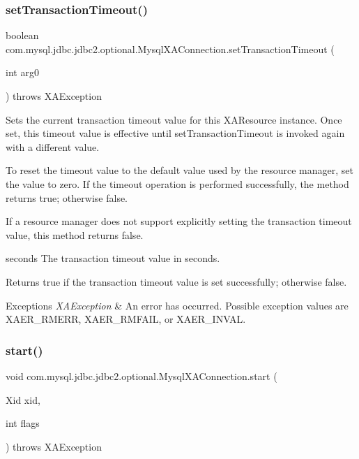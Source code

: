 \subsubsection{\texorpdfstring{set\+Transaction\+Timeout()}{setTransactionTimeout()}}
{\footnotesize\ttfamily boolean com.\+mysql.\+jdbc.\+jdbc2.\+optional.\+Mysql\+X\+A\+Connection.\+set\+Transaction\+Timeout (\begin{DoxyParamCaption}\item[{int}]{arg0 }\end{DoxyParamCaption}) throws X\+A\+Exception}

Sets the current transaction timeout value for this X\+A\+Resource instance. Once set, this timeout value is effective until set\+Transaction\+Timeout is invoked again with a different value.

To reset the timeout value to the default value used by the resource manager, set the value to zero. If the timeout operation is performed successfully, the method returns true; otherwise false.

If a resource manager does not support explicitly setting the transaction timeout value, this method returns false.

seconds The transaction timeout value in seconds.

\begin{DoxyReturn}{Returns}
true if the transaction timeout value is set successfully; otherwise false.
\end{DoxyReturn}

\begin{DoxyExceptions}{Exceptions}
{\em X\+A\+Exception} & An error has occurred. Possible exception values are X\+A\+E\+R\+\_\+\+R\+M\+E\+RR, X\+A\+E\+R\+\_\+\+R\+M\+F\+A\+IL, or X\+A\+E\+R\+\_\+\+I\+N\+V\+AL. \\
\hline
\end{DoxyExceptions}
\mbox{\label{classcom_1_1mysql_1_1jdbc_1_1jdbc2_1_1optional_1_1_mysql_x_a_connection_a7c2af1d5be8d8ba54c6293c6e3e61ffd}} 
\subsubsection{\texorpdfstring{start()}{start()}}
{\footnotesize\ttfamily void com.\+mysql.\+jdbc.\+jdbc2.\+optional.\+Mysql\+X\+A\+Connection.\+start (\begin{DoxyParamCaption}\item[{Xid}]{xid,  }\item[{int}]{flags }\end{DoxyParamCaption}) throws X\+A\+Exception}

